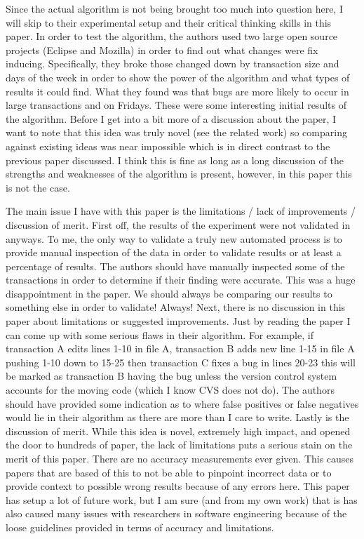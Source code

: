 \documentclass[conference]{IEEEtran}
\begin{document}
Since the actual algorithm is not being brought too much into question here, I will skip to their experimental setup and their critical
thinking skills in this paper. In order to test the algorithm, the authors used two large open source projects (Eclipse and Mozilla) in order
to find out what changes were fix inducing. Specifically, they broke those changed down by transaction size and days of the week in order
to show the power of the algorithm and what types of results it could find. What they found was that bugs are more likely to occur in 
large transactions and on Fridays. These were some interesting initial results of the algorithm. Before I get into a bit more of a discussion
about the paper, I want to note that this idea was truly novel (see the related work) so comparing against existing ideas was near impossible
which is in direct contrast to the previous paper discussed. I think this is fine as long as a long discussion of the strengths and weaknesses
of the algorithm is present, however, in this paper this is not the case.

The main issue I have with this paper is the limitations / lack of improvements / discussion of merit. First off, the results of the experiment
were not validated in anyways. To me, the only way to validate a truly new automated process is to provide manual inspection of the data
in order to validate results or at least a percentage of results. The authors should have manually inspected some of the transactions in order
to determine if their finding were accurate. This was a huge disappointment in the paper. We should always be comparing our results to something
else in order to validate! Always! Next, there is no discussion in this paper about limitations or suggested improvements. Just by reading
the paper I can come up with some serious flaws in their algorithm. For example, if transaction A edits lines 1-10 in file A, transaction B
adds new line 1-15 in file A pushing 1-10 down to 15-25 then transaction C fixes a bug in lines 20-23 this will be marked as transaction B
having the bug unless the version control system accounts for the moving code (which I know CVS does not do). The authors should have provided
some indication as to where false positives or false negatives would lie in their algorithm as there are more than I care to write. Lastly is the
discussion of merit. While this idea is novel, extremely high impact, and opened the door to hundreds of paper, the lack of limitations puts
a serious stain on the merit of this paper. There are no accuracy measurements ever given. This causes papers that are based of this to not
be able to pinpoint incorrect data or to provide context to possible wrong results because of any errors here. This paper has setup a lot
of future work, but I am sure (and from my own work) that is has also caused many issues with researchers in software engineering because
of the loose guidelines provided in terms of accuracy and limitations.
\end{document}
